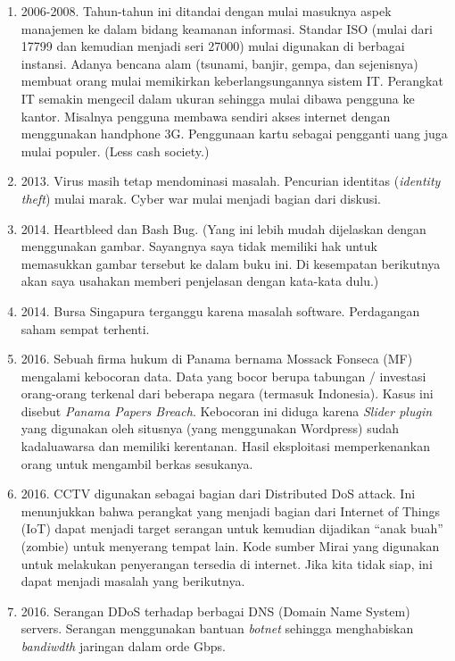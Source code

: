 \begin{enumerate}
\item 2006-2008. Tahun-tahun ini ditandai dengan mulai masuknya
   aspek manajemen ke dalam bidang keamanan informasi.
   Standar ISO (mulai dari 17799 dan kemudian menjadi seri 27000)
   mulai digunakan di berbagai instansi.
   Adanya bencana alam (tsunami, banjir, gempa, dan sejenisnya)
   membuat orang mulai memikirkan keberlangsungannya sistem IT.
   Perangkat IT semakin mengecil dalam ukuran sehingga mulai dibawa
   pengguna ke kantor. Misalnya pengguna membawa sendiri akses
   internet dengan menggunakan handphone 3G.
   Penggunaan kartu sebagai pengganti uang juga mulai populer.
   (Less cash society.)

\item 2013. Virus masih tetap mendominasi masalah.
   Pencurian identitas ({\em identity theft}) mulai marak.
   Cyber war mulai menjadi bagian dari diskusi.
\item 2014. Heartbleed dan Bash Bug.
   (Yang ini lebih mudah dijelaskan dengan menggunakan gambar.
   Sayangnya saya tidak memiliki hak untuk memasukkan gambar tersebut
   ke dalam buku ini. Di kesempatan berikutnya akan saya usahakan
   memberi penjelasan dengan kata-kata dulu.)
\item 2014. Bursa Singapura terganggu karena masalah software.
   Perdagangan saham sempat terhenti.
\item 2016.
   Sebuah firma hukum di Panama bernama Mossack Fonseca (MF)
   mengalami kebocoran data.
   Data yang bocor berupa tabungan / investasi orang-orang terkenal
   dari beberapa negara (termasuk Indonesia).
   Kasus ini disebut {\em Panama Papers Breach}.
   Kebocoran ini diduga karena {\em Slider plugin} yang digunakan
   oleh situsnya (yang menggunakan Wordpress) sudah kadaluawarsa dan
   memiliki kerentanan. Hasil eksploitasi memperkenankan orang untuk
   mengambil berkas sesukanya.
\item 2016. 
   CCTV digunakan sebagai bagian dari Distributed DoS attack.
   Ini menunjukkan bahwa perangkat yang menjadi bagian dari
   Internet of Things (IoT) dapat menjadi target serangan
   untuk kemudian dijadikan ``anak buah'' (zombie) untuk
   menyerang tempat lain.
   Kode sumber Mirai yang digunakan untuk melakukan penyerangan
   tersedia di internet. Jika kita tidak siap, ini dapat menjadi
   masalah yang berikutnya.
\item 2016.
   Serangan DDoS terhadap berbagai DNS (Domain Name System) servers.
   Serangan menggunakan bantuan {\em botnet}
   sehingga menghabiskan {\em bandiwdth} jaringan dalam orde
   Gbps.
\end{enumerate}

